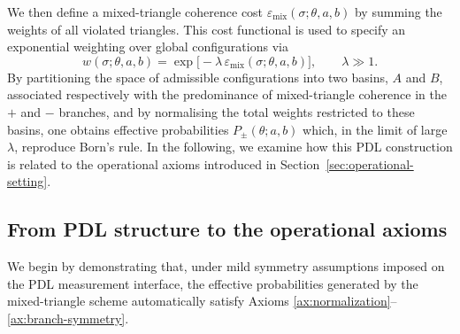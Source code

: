 \documentclass[11pt,a4paper]{article}
\numberwithin{equation}{section}
\theoremstyle{definition}
\begin{document}
We then define a mixed-triangle coherence cost $\varepsilon_{\mathrm{mix}}(\sigma;\theta,a,b)$ by summing the weights of all violated triangles. This cost functional is used to specify an exponential weighting over global configurations via
\begin{equation}
w(\sigma;\theta,a,b)
=
\exp\bigl[-\lambda\,\varepsilon_{\mathrm{mix}}(\sigma;\theta,a,b)\bigr],
\qquad \lambda\gg 1.
\end{equation}
By partitioning the space of admissible configurations into two basins, $A$ and $B$, associated respectively with the predominance of mixed-triangle coherence in the $+$ and $-$ branches, and by normalising the total weights restricted to these basins, one obtains effective probabilities $P_\pm(\theta; a,b)$ which, in the limit of large $\lambda$, reproduce Born’s rule.\cite{LaubscherBornPDL2026} In the following, we examine how this PDL construction is related to the operational axioms introduced in Section~\ref{sec:operational-setting}.

\subsection{From PDL structure to the operational axioms}

We begin by demonstrating that, under mild symmetry assumptions imposed on the PDL measurement interface, the effective probabilities generated by the mixed-triangle scheme automatically satisfy Axioms \ref{ax:normalization}--\ref{ax:branch-symmetry}.
\end{document}
